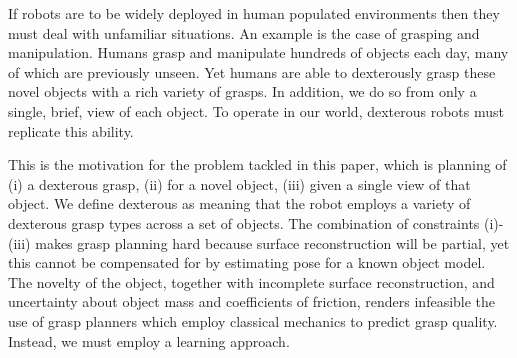 \noindent
If robots are to be widely deployed in human populated environments then they must deal with unfamiliar situations. An example is the case of grasping and manipulation. Humans grasp and manipulate hundreds of objects each day, many of which are previously unseen. Yet humans are able to dexterously grasp these novel objects with a rich variety of grasps. In addition, we do so from only a single, brief, view of each object. To operate in our world, dexterous robots must replicate this ability.

This is the motivation for the problem tackled in this paper, which is planning of (i) a dexterous grasp, (ii) for a novel object, (iii) given a single view of that object. We define dexterous as meaning that the robot employs a variety of dexterous grasp types across a set of objects. The combination of constraints (i)-(iii) makes grasp planning hard because surface reconstruction will be partial, yet this cannot be compensated for by estimating pose for a known object model. The novelty of the object, together with incomplete surface reconstruction, and uncertainty about object mass and coefficients of friction, renders infeasible the use of grasp planners which employ classical mechanics to predict grasp quality. Instead, we must employ a learning approach.

